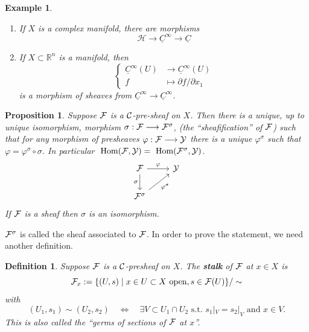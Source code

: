 \documentclass[11pt]{article}
\newtheorem{prop}[thm]{Proposition}
\newtheorem{dfn}[thm]{Definition}
\newtheorem{ex}[thm]{Example}
\renewcommand{\hom}{\text{ Hom}}
\newcommand{\reals}{\mathbb R}
\newcommand{\calf}{{\cal F}}
\newcommand{\calc}{{\cal C}}
\begin{document}
\begin{ex}
    \begin{enumerate}[label=(\arabic*)]
        \item 
        If $X$ is a complex manifold, there are morphisms
        $$
        \mathcal H \longrightarrow \underline C^\infty \longrightarrow \underline C
        $$
        \item
        If $X\subset \reals^n$ is a manifold, then
        $$
        \left\{
        \begin{aligned}
        \underline C^\infty (U) & \longrightarrow \underline C^\infty(U) \\
        f & \longmapsto \partial f / \partial x_1
        \end{aligned}
        \right.
        $$
        is a morphism of sheaves from $\underline C^\infty \longrightarrow \underline C^\infty$.
    \end{enumerate}
\end{ex}

\begin{prop}
    Suppose $\calf$ is a $\calc$-pre-sheaf on $X$. Then there is a unique, up to unique isomorphism, morphism $\sigma: \calf\longrightarrow \calf^\sigma$, (the ``sheafification'' of $\calf$) such that for any morphism of presheaves $\varphi: \calf \longrightarrow \mathcal Y$ there is a unique $\varphi^\sigma$ such that $\varphi = \varphi^\sigma \circ \sigma$. In particular $\hom (\calf, \mathcal Y) = \hom (\calf^\sigma, \mathcal Y)$.
    $$
    \begin{tikzcd}
    \calf \arrow[r, "\varphi"] \arrow[d, "\sigma"'] & \mathcal Y  \\
    \calf^\sigma \arrow{ru}[swap]{\varphi^\sigma}
    \end{tikzcd}
    $$
    If $\calf$ is a sheaf then $\sigma$ is an isomorphism.
\end{prop}

$\calf^\sigma$ is called the sheaf associated to $\calf$. In order to prove the statement, we need another definition.

\begin{dfn}
    Suppose $\calf$ is a $\calc$-presheaf on $X$. The \textbf{stalk} of $\calf$ at $x\in X$ is 
        $$
        \calf_x := \{ (U,s) \mid x \in U\subset X \text{ open}, s \in \calf(U)\} / \sim
        $$
        with 
        $$(U_1, s_1) \sim (U_2,s_2) \quad \Longleftrightarrow \quad \exists V\subset U_1 \cap U_2 \text{ s.t. } s_1|_V = s_2|_V \text{ and } x \in V.
        $$
        This is also called the ``germs of sections of $\calf$ at $x$''.
\end{dfn}
\end{document}
